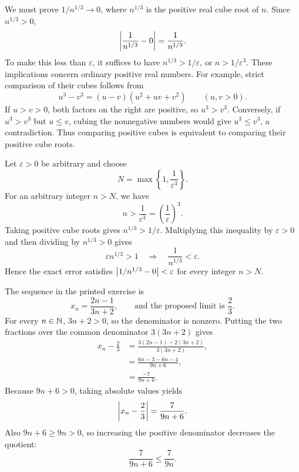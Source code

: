 
We must prove $1/n^{1/3}\to0$, where $n^{1/3}$ is the positive real
cube root of $n$. Since $n^{1/3}>0$,
\[
 \left|\frac1{n^{1/3}}-0\right|=\frac1{n^{1/3}}.
\]
To make this less than $\varepsilon$, it suffices to have
$n^{1/3}>1/\varepsilon$, or $n>1/\varepsilon^3$.
These implications concern ordinary positive real numbers.
For example, strict comparison of their cubes follows from
\[
 u^3-v^3=(u-v)(u^2+uv+v^2)
 \qquad(u,v>0).
\]
If $u>v>0$, both factors on the right are positive, so $u^3>v^3$.
Conversely, if $u^3>v^3$ but $u\le v$, cubing the nonnegative
numbers would give $u^3\le v^3$, a contradiction. Thus comparing
positive cubes is equivalent to comparing their positive cube roots.

Let $\varepsilon>0$ be arbitrary and choose
\[
 N=\max\left\{1,\frac1{\varepsilon^3}\right\}.
\]
For an arbitrary integer $n>N$, we have
\[
 n>\frac1{\varepsilon^3}=\left(\frac1\varepsilon\right)^3.
\]
Taking positive cube roots gives $n^{1/3}>1/\varepsilon$.
Multiplying this inequality by $\varepsilon>0$ and then dividing by
$n^{1/3}>0$ gives
\[
 \varepsilon n^{1/3}>1
 \quad\Longrightarrow\quad
 \frac1{n^{1/3}}<\varepsilon.
\]
Hence the exact error satisfies
$\left|1/n^{1/3}-0\right|<\varepsilon$ for every integer $n>N$.


The sequence in the printed exercise is
\[
 x_n=\frac{2n-1}{3n+2},
 \qquad\text{and the proposed limit is }\frac23.
\]
For every $n\in\mathbb{N}$, $3n+2>0$, so the denominator is nonzero.
Putting the two fractions over the common denominator $3(3n+2)$ gives
\begin{align*}
 x_n-\frac23
   &=\frac{3(2n-1)-2(3n+2)}{3(3n+2)},\\
   &=\frac{6n-3-6n-4}{9n+6},\\
   &=\frac{-7}{9n+6}.
\end{align*}
Because $9n+6>0$, taking absolute values yields
\[
 \left|x_n-\frac23\right|=\frac7{9n+6}.
\]
Also $9n+6\ge9n>0$, so increasing the positive denominator decreases
the quotient:
\[
 \frac7{9n+6}\le\frac7{9n}.
\]

